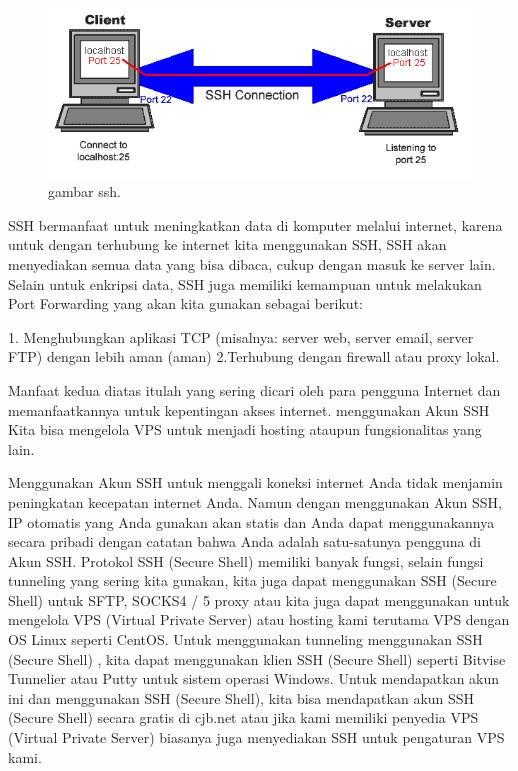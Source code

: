 \begin{figure}[ht]
\centerline{\includegraphics[width=1\textwidth]{figures/ssh.gif}}
\caption{gambar ssh.}
\label{ssh}
\end{figure}


SSH bermanfaat untuk meningkatkan data di komputer melalui internet, karena untuk dengan terhubung ke internet kita menggunakan SSH, SSH akan menyediakan semua data yang bisa dibaca, cukup dengan masuk ke server lain.
Selain untuk enkripsi data, SSH juga memiliki kemampuan untuk melakukan Port Forwarding yang akan kita gunakan sebagai berikut:

1. Menghubungkan aplikasi TCP (misalnya: server web, server email, server FTP) dengan lebih aman (aman)
2.Terhubung dengan firewall atau proxy lokal.

Manfaat kedua diatas itulah yang sering dicari oleh para pengguna Internet dan memanfaatkannya untuk kepentingan akses internet. menggunakan Akun SSH Kita bisa mengelola VPS untuk menjadi hosting ataupun fungsionalitas yang lain.

Menggunakan Akun SSH untuk menggali koneksi internet Anda tidak menjamin peningkatan kecepatan internet Anda. Namun dengan menggunakan Akun SSH, IP otomatis yang Anda gunakan akan statis dan Anda dapat menggunakannya secara pribadi dengan catatan bahwa Anda adalah satu-satunya pengguna di Akun SSH.
Protokol SSH (Secure Shell) memiliki banyak fungsi, selain fungsi tunneling yang sering kita gunakan, kita juga dapat menggunakan SSH (Secure Shell) untuk SFTP, SOCKS4 / 5 proxy atau kita juga dapat menggunakan untuk mengelola VPS (Virtual Private Server) atau hosting kami terutama VPS dengan OS Linux seperti CentOS. Untuk menggunakan tunneling menggunakan SSH (Secure Shell) , kita dapat menggunakan klien SSH (Secure Shell) seperti Bitvise Tunnelier atau Putty untuk sistem operasi Windows.
Untuk mendapatkan akun ini dan menggunakan SSH (Secure Shell), kita bisa mendapatkan akun SSH (Secure Shell) secara gratis di cjb.net atau jika kami memiliki penyedia VPS (Virtual Private Server) biasanya juga menyediakan SSH untuk pengaturan VPS kami.

